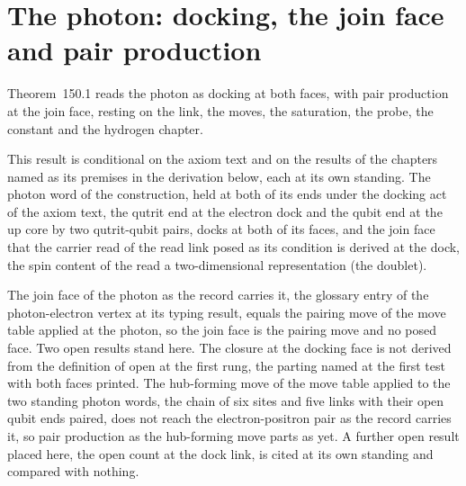 \section{The photon: docking, the join face and pair production}\label{mod:V-8-photon-docking-the-join-face-and-pair-production}
\label{narr:open:5-8}Theorem~150.1 reads the photon as docking at both faces, with pair production at the join face, resting on the link, the moves, the saturation, the probe, the constant and the hydrogen chapter.
\begin{chconditional}\label{box:V-8-photon-docking-the-join-face-and-pair-production:1}
This result is conditional on the axiom text and on the results of the chapters named as its premises in the derivation below, each at its own standing.
The photon word of the construction, held at both of its ends under the docking act of the axiom text, the qutrit end at the electron dock and the qubit end at the up core by two qutrit-qubit pairs, docks at both of its faces, and the join face that the carrier read of the read link posed as its condition is derived at the dock, the spin content of the read a two-dimensional representation (the doublet).
\end{chconditional}
The join face of the photon as the record carries it, the glossary entry of the photon-electron vertex at its typing result, equals the pairing move of the move table applied at the photon, so the join face is the pairing move and no posed face.
Two open results stand here. The closure at the docking face is not derived from the definition of open at the first rung, the parting named at the first test with both faces printed. The hub-forming move of the move table applied to the two standing photon words, the chain of six sites and five links with their open qubit ends paired, does not reach the electron-positron pair as the record carries it, so pair production as the hub-forming move parts as yet. A further open result placed here, the open count at the dock link, is cited at its own standing and compared with nothing.
